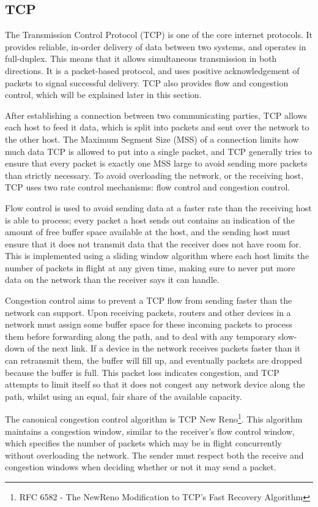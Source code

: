 \subsection{TCP}
\label{sec:bg:tcp}
The Transmission Control Protocol (TCP) is one of the core internet protocols.
It provides reliable, in-order delivery of data between two
systems, and operates in full-duplex. This means that it allows simultaneous
transmission in both directions. It is a packet-based
protocol, and uses positive acknowledgement of packets to signal successful
delivery. TCP also provides flow and congestion
control, which will be explained later in this section.

After establishing a connection between two communicating parties, TCP allows
each host to feed it data, which is split into packets and sent over the
network to the other host. The Maximum Segment Size (MSS) of a connection limits
how much data TCP is allowed to put into a single packet, and TCP generally
tries to ensure that every packet is exactly one MSS large to avoid sending
more packets than strictly necessary. To avoid overloading the network, or
the receiving host, TCP uses two rate
control mechanisms: flow control and congestion control.

Flow control is used to
avoid sending data at a faster rate than the receiving host is able to process;
every packet a host sends out contains an indication of the amount of free
buffer space available at the host, and the sending host must ensure that it
does not transmit data that the receiver does not have room for. This is
implemented using a sliding window algorithm where each host limits the number
of packets in flight at any given time, making sure to never put more data on
the network than the receiver says it can handle.

Congestion control aims to prevent a TCP flow from sending faster than the
network can support. Upon receiving packets, routers and other devices in a
network must assign some buffer space for these incoming packets to process them
before forwarding along the path, and to deal with any temporary slow-down of the
next link. If a device in the network receives packets faster than it can
retransmit them, the buffer will fill up, and eventually packets are dropped
because the buffer is full. This packet loss indicates congestion, and TCP
attempts to limit itself so that it does not congest any network device along
the path, whilst using an equal, fair share of the available capacity.

The canonical congestion control algorithm is TCP New Reno\footnote{RFC 6582 -
The NewReno Modification to TCP's Fast Recovery Algorithm}. This algorithm
maintains a congestion window, similar to the receiver's flow control window,
which specifies the number of packets which may be in flight concurrently
without overloading the network. The sender must respect both the receive and
congestion windows when deciding whether or not it may send a packet.

